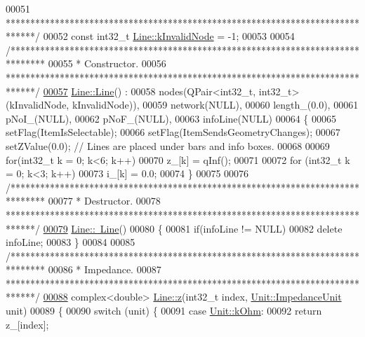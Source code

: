 \begin{DoxyCode}
00051 \textcolor{comment}{ ******************************************************************************/}
00052 \textcolor{keyword}{const} int32\_t \hyperlink{group___models_gadc334bd07c6126abc56e531d7e3e72b4}{Line::kInvalidNode} = -1;
00053 
00054 \textcolor{comment}{/*******************************************************************************}
00055 \textcolor{comment}{ * Constructor.}
00056 \textcolor{comment}{ ******************************************************************************/}
\hypertarget{line_8cpp_source_l00057}{}\hyperlink{group___models_gacc11b8a429d8cdd63ba6803dff5602b3}{00057} \hyperlink{group___models_gacc11b8a429d8cdd63ba6803dff5602b3}{Line::Line}() :
00058   nodes(QPair<int32\_t, int32\_t>(kInvalidNode, kInvalidNode)),
00059   network(NULL),
00060   length\_(0.0),
00061   pNoI\_(NULL),
00062   pNoF\_(NULL),
00063   infoLine(NULL)
00064 \{
00065   setFlag(ItemIsSelectable);
00066   setFlag(ItemSendsGeometryChanges);
00067   setZValue(0.0); \textcolor{comment}{// Lines are placed under bars and info boxes.}
00068 
00069   \textcolor{keywordflow}{for}(int32\_t k = 0; k<6; k++)
00070     z\_[k] = qInf();
00071 
00072   \textcolor{keywordflow}{for} (int32\_t k = 0; k<3; k++)
00073     i\_[k] = 0.0;
00074 \}
00075 
00076 \textcolor{comment}{/*******************************************************************************}
00077 \textcolor{comment}{ * Destructor.}
00078 \textcolor{comment}{ ******************************************************************************/}
\hypertarget{line_8cpp_source_l00079}{}\hyperlink{group___models_gaabe85f48d22d92b62257091f48174fac}{00079} \hyperlink{group___models_gaabe85f48d22d92b62257091f48174fac}{Line::~Line}()
00080 \{
00081   \textcolor{keywordflow}{if}(infoLine != NULL)
00082     \textcolor{keyword}{delete} infoLine;
00083 \}
00084 
00085 \textcolor{comment}{/*******************************************************************************}
00086 \textcolor{comment}{ * Impedance.}
00087 \textcolor{comment}{ ******************************************************************************/}
\hypertarget{line_8cpp_source_l00088}{}\hyperlink{group___models_gab5370574fd93e13eb11742f7753fe1f1}{00088} complex<double> \hyperlink{group___models_gab5370574fd93e13eb11742f7753fe1f1}{Line::z}(int32\_t index, \hyperlink{class_unit_a3747e779c805df24a71961290be3fbdf}{Unit::ImpedanceUnit} unit)
00089 \{
00090   \textcolor{keywordflow}{switch} (unit) \{
00091   \textcolor{keywordflow}{case} \hyperlink{class_unit_a3747e779c805df24a71961290be3fbdfa6b9c74d1763eefbaf751eeecff0bd9da}{Unit::kOhm}:
00092     \textcolor{keywordflow}{return} z\_[index];

\end{DoxyCode}

